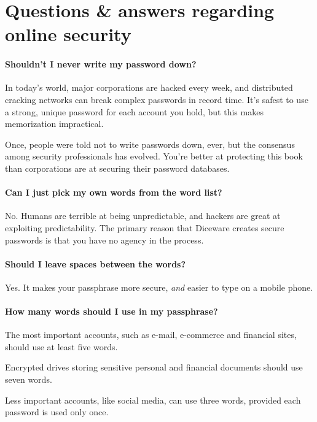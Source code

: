 \chapter*{Questions \& answers regarding online security}
\small
\label{ch:qna}

\subsubsection{Shouldn't I never write my password down?}

In today's world, major corporations are hacked every week, and distributed cracking networks can break complex passwords in record time. It's safest to use a strong, unique password for each account you hold, but this makes memorization impractical. 

Once, people were told not to write passwords down, ever, but the consensus among security professionals has evolved. You're better at protecting this book than corporations are at securing their password databases. 

\subsubsection{Can I just pick my own words from the word list?}

No. Humans are terrible at being unpredictable, and hackers are great at exploiting predictability. The primary reason that Diceware creates secure passwords is that you have no agency in the process.

\subsubsection{Should I leave spaces between the words?}

Yes. It makes your passphrase more secure, \textit{and} easier to type on a mobile phone.

\subsubsection{How many words should I use in my passphrase?}

The most important accounts, such as e-mail, e-commerce and financial sites, should use at least five words.

Encrypted drives storing sensitive personal and financial documents should use seven words.

Less important accounts, like social media, can use three words, provided each password is used only once.

